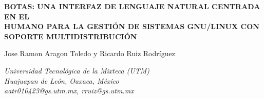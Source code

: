 \documentclass[10pt,a4paper]{article}
\begin{document}

{
\centering
\fontsize{16}{19.2}\bfseries
BOTAS: UNA INTERFAZ DE LENGUAJE NATURAL CENTRADA EN EL\\
HUMANO PARA LA GESTIÓN DE SISTEMAS GNU/LINUX CON\\
SOPORTE MULTIDISTRIBUCIÓN\par
\vspace{24pt}
}

{
\centering
\fontsize{11}{13.2}\selectfont
Jose Ramon Aragon Toledo y Ricardo Ruiz Rodr\'{i}guez\par
\vspace{6pt}
\fontsize{9}{10.8}\itshape
Universidad Tecnol\'{o}gica de la Mixteca (UTM)\\
Huajuapan de Le\'{o}n, Oaxaca, M\'{e}xico\\
aatr010423@gs.utm.mx, rruiz@gs.utm.mx\par
\vspace{24pt}
}
\end{document}
